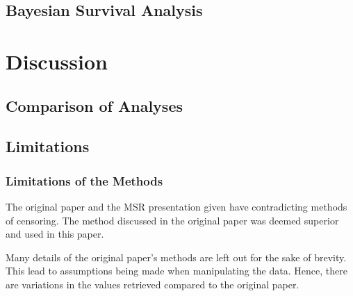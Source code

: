 \documentclass[acmconf]{acmart}
\begin{document}
\subsection{Bayesian Survival Analysis}


\section{Discussion}

\subsection{Comparison of Analyses}


\subsection{Limitations}

\subsubsection{Limitations of the Methods}

The original paper \cite{ali2020cheating} and the MSR presentation given \cite{ali2020video} have contradicting methods of censoring.
The method discussed in the original paper was deemed superior and used in this paper.

Many details of the original paper's methods are left out for the sake of brevity.
This lead to assumptions being made when manipulating the data.
Hence, there are variations in the values retrieved compared to the original paper.
\end{document}
